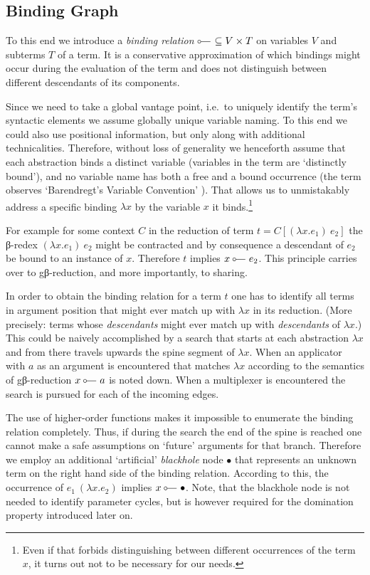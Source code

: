 \documentclass[submission,copyright,creativecommons]{eptcs}
\newcommand\binds{\mathrel{\scriptsize\fourier\hspace{-0.3em}}}
\newcommand\blackhole{\bullet}
\renewcommand\;{\,}
\begin{document}
\subsection{Binding Graph}

To this end we introduce a \textit{binding relation} $\binds\ \subseteq V\times
T$ on variables $V$ and subterms $T$ of a term. It is a conservative approximation
of which bindings might occur during the evaluation of the term and does not
distinguish between different descendants of its components.

Since we need to take a global vantage point, i.e.\ to uniquely identify the
term's syntactic elements we assume globally unique variable naming. To this
end we could also use positional information, but only along with additional
technicalities. Therefore, without loss of generality we henceforth assume that
each abstraction binds a distinct variable (variables in the term are `distinctly bound'), 
and no variable name has both a free and a bound occurrence (the term observes `Barendregt's Variable Convention' \cite[2.1.13, p.26]{bare:1984}). 
That allows us to unmistakably address a specific
binding $λx$ by the variable $x$ it binds.\footnote{Even if that forbids
distinguishing between different occurrences of the term $x$, it turns out not
to be necessary for our needs.}

For example for some context $C$ in the reduction of term $t=C[(λx.e_1)~e_2]$
the β-redex $(λx.e_1)~e_2$ might be contracted and by consequence a
descendant of $e_2$ be bound to an instance of $x$. Therefore $t$ implies $x
\binds e_2$. This principle carries over to gβ-reduction, and more importantly,
to sharing.

In order to obtain the binding relation for a term $t$ one has to identify all
terms in argument position that might ever match up with $λx$ in its reduction.
(More precisely: terms whose {\it descendants} might ever match up with {\it
descendants} of $λx$.) This could be naively accomplished by a search that
starts at each abstraction $λx$ and from there travels upwards the spine
segment of $λx$. When an applicator with $a$ as an argument is encountered that
matches $λx$ according to the semantics of gβ-reduction $x\binds a$ is noted
down. When a multiplexer is encountered the search is pursued for each of the
incoming edges.

The use of higher-order functions makes it impossible to enumerate the binding
relation completely. Thus, if during the search
the end of the spine is reached one cannot make a safe assumptions on
`future' arguments for that branch. Therefore we employ an additional
`artificial' {\it blackhole} node $\blackhole$ that represents an unknown term
on the right hand side of the binding relation. According to this, the
occurrence of $e_1~(λx.e_2)$ implies $x\binds\blackhole$. Note, that the
blackhole node is not needed to identify parameter cycles, but is however
required for the domination property introduced later on.
\end{document}
